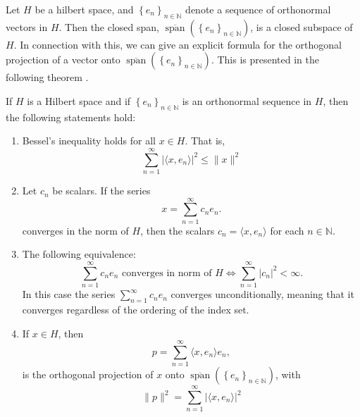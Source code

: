 Let $H$ be a hilbert space, and $\left\{ e_{n} \right\}_{n\in \mathbb{N}}$ denote a sequence of orthonormal vectors in $H$. Then the closed span, $\overline{\operatorname{span}}\left( \left\{ e_{n} \right\}_{n\in \mathbb{N}} \right)$, is a closed subspace of $H$. In connection with this, we can give an explicit formula for the orthogonal projection of a vector onto $\overline{\operatorname{span}}\left( \left\{ e_{n} \right\}_{n\in \mathbb{N}} \right)$. This is presented in the following theorem \cite[p.~210]{heilMetricsNormsInner2018}.
%
%
\begin{theorem}\label{thrm:orthog_proj_formula_and_facts}
    If $H$ is a Hilbert space and if $\left\{ e_{n} \right\}_{n\in \mathbb{N}}$ is an orthonormal sequence in $H$,  then the following statements hold:
    \begin{enumerate}[label=(\alph*)]
        \item \label{eq:opfaf_a} Bessel's inequality holds for all $x \in H$. That is, 
        \begin{equation}
            \sum_{n=1}^{\infty} \left| \langle x, e_n \rangle \right|^2 \leq \| x\|^2 
        \end{equation}
        
        \item \label{eq:opfaf:b} Let $c_n$ be scalars. If the series $$ x=\sum_{n=1}^\infty c_n e_n.$$ converges in the norm of $H$, then the scalars $c_n= \langle x, e_n\rangle$ for each $n \in \mathbb{N}$.
        
        \item \label{eq:opfaf_c} The following equivalence: 
        \begin{equation}
            \sum_{n=1}^{\infty} c_n e_n \text{ converges in norm of } H \Longleftrightarrow \sum_{n=1}^{\infty} \left| c_n \right|^2 < \infty.
        \end{equation}
        In this case the series $\sum_{n=1}^{\infty} c_n e_n$ converges unconditionally, meaning that it converges regardless of the ordering of the index set.
        
        \item \label{eq:opfaf_d} If $x \in H$, then 
        \begin{equation} 
            p= \sum_{n=1}^{\infty} \langle x, e_n \rangle e_n, 
        \end{equation} 
        is the orthogonal projection of $x$ onto  $\overline{\operatorname{span}} \left( \left\{ e_{n} \right\}_{n\in \mathbb{N}} \right) $, with
        \begin{equation}
            \| p\|^2 = \sum_{n=1}^{\infty} \left| \langle x,e_n \rangle \right|^2
        \end{equation}
        

\end{enumerate}
\end{theorem}
